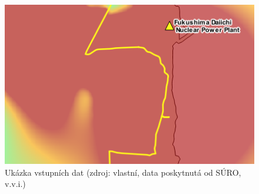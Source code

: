\begin{figure}[H]
    \centering
    \includegraphics[scale=0.6]{./pictures/ukazka_vstupnich_dat.png}
    \caption[Ukázka vstupních dat]{Ukázka vstupních dat (zdroj: vlastní, data poskytnutá od SÚRO, v.v.i.)}
    \label{fig:vstup}
\end{figure}
  			
